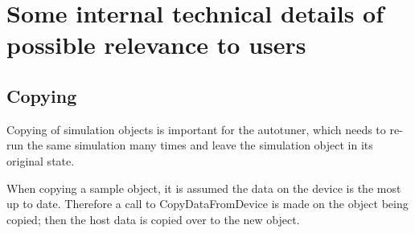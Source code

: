 \documentclass[a4paper]{article}
\begin{document}
\section{Some internal technical details of possible 
  relevance to users}

\subsection{Copying}

Copying of simulation objects is important for the autotuner, which needs to
re-run the same simulation many times and leave the simulation object in its
original state.

When copying a sample object, it is assumed the data on the device is the most
up to date. Therefore a call to CopyDataFromDevice is made on the object being 
copied; then the host data is copied over to the new object.
\end{document}
